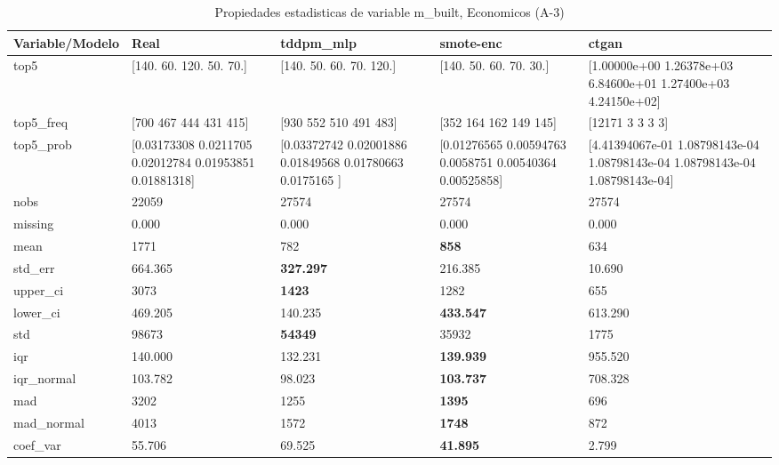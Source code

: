\begin{table}[H]
\centering
\fontsize{8}{14}\selectfont
\caption{Propiedades  estadisticas de variable m\_built, Economicos (A-3)}
\label{table-stats-economicos-a-3-m_built}
\begin{tabular}{|l|m{10em}|m{10em}|m{10em}|m{10em}|}
\hline
 \rowcolor[gray]{0.8}
Variable/Modelo & Real & tddpm\_mlp & smote-enc & ctgan \\
\hline top5 & [140.  60. 120.  50.  70.] & [140.  50.  60.  70. 120.] & [140.  50.  60.  70.  30.] & [1.00000e+00 1.26378e+03 6.84600e+01 1.27400e+03 4.24150e+02] \\
\hline top5\_freq & [700 467 444 431 415] & [930 552 510 491 483] & [352 164 162 149 145] & [12171     3     3     3     3] \\
\hline top5\_prob & [0.03173308 0.0211705  0.02012784 0.01953851 0.01881318] & [0.03372742 0.02001886 0.01849568 0.01780663 0.0175165 ] & [0.01276565 0.00594763 0.0058751  0.00540364 0.00525858] & [4.41394067e-01 1.08798143e-04 1.08798143e-04 1.08798143e-04
 1.08798143e-04] \\
\hline nobs & 22059 & 27574 & 27574 & 27574 \\
\hline missing & 0.000 & 0.000 & 0.000 & 0.000 \\
\hline mean & 1771 & 782 & \bfseries 858 & \cellcolor[rgb]{0.9, 0.54, 0.52} 634 \\
\hline std\_err & 664.365 & \bfseries 327.297 & 216.385 & \cellcolor[rgb]{0.9, 0.54, 0.52} 10.690 \\
\hline upper\_ci & 3073 & \bfseries 1423 & 1282 & \cellcolor[rgb]{0.9, 0.54, 0.52} 655 \\
\hline lower\_ci & 469.205 & \cellcolor[rgb]{0.9, 0.54, 0.52} 140.235 & \bfseries 433.547 & 613.290 \\
\hline std & 98673 & \bfseries 54349 & 35932 & \cellcolor[rgb]{0.9, 0.54, 0.52} 1775 \\
\hline iqr & 140.000 & 132.231 & \bfseries 139.939 & \cellcolor[rgb]{0.9, 0.54, 0.52} 955.520 \\
\hline iqr\_normal & 103.782 & 98.023 & \bfseries 103.737 & \cellcolor[rgb]{0.9, 0.54, 0.52} 708.328 \\
\hline mad & 3202 & 1255 & \bfseries 1395 & \cellcolor[rgb]{0.9, 0.54, 0.52} 696 \\
\hline mad\_normal & 4013 & 1572 & \bfseries 1748 & \cellcolor[rgb]{0.9, 0.54, 0.52} 872 \\
\hline coef\_var & 55.706 & 69.525 & \bfseries 41.895 & \cellcolor[rgb]{0.9, 0.54, 0.52} 2.799 \\

\end{tabular}
\end{table}
